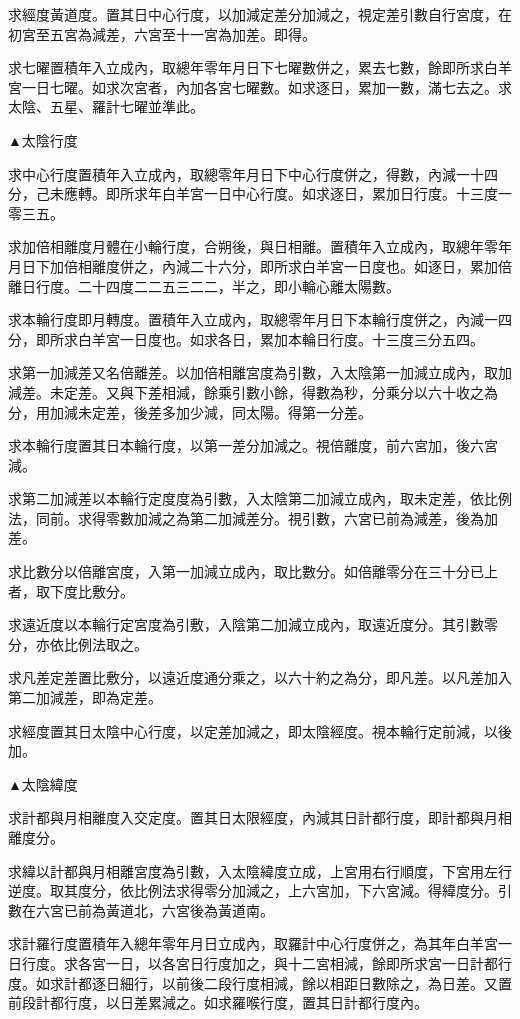 求經度黃道度。置其日中心行度，以加減定差分加減之，視定差引數自行宮度，在初宮至五宮為減差，六宮至十一宮為加差。即得。

求七曜置積年入立成內，取總年零年月日下七曜數併之，累去七數，餘即所求白羊宮一日七曜。如求次宮者，內加各宮七曜數。如求逐日，累加一數，滿七去之。求太陰、五星、羅計七曜並準此。

▲太陰行度

求中心行度置積年入立成內，取總零年月日下中心行度併之，得數，內減一十四分，己未應轉。即所求年白羊宮一日中心行度。如求逐日，累加日行度。十三度一零三五。

求加倍相離度月體在小輪行度，合朔後，與日相離。置積年入立成內，取總年零年月日下加倍相離度併之，內減二十六分，即所求白羊宮一日度也。如逐日，累加倍離日行度。二十四度二二五三二二，半之，即小輪心離太陽數。

求本輪行度即月轉度。置積年入立成內，取總零年月日下本輪行度併之，內減一四分，即所求白羊宮一日度也。如求各日，累加本輪日行度。十三度三分五四。

求第一加減差又名倍離差。以加倍相離宮度為引數，入太陰第一加減立成內，取加減差。未定差。又與下差相減，餘乘引數小餘，得數為秒，分乘分以六十收之為分，用加減未定差，後差多加少減，同太陽。得第一分差。

求本輪行度置其日本輪行度，以第一差分加減之。視倍離度，前六宮加，後六宮減。

求第二加減差以本輪行定度度為引數，入太陰第二加減立成內，取未定差，依比例法，同前。求得零數加減之為第二加減差分。視引數，六宮已前為減差，後為加差。

求比數分以倍離宮度，入第一加減立成內，取比數分。如倍離零分在三十分已上者，取下度比敷分。

求遠近度以本輪行定宮度為引敷，入陰第二加減立成內，取遠近度分。其引數零分，亦依比例法取之。

求凡差定差置比敷分，以遠近度通分乘之，以六十約之為分，即凡差。以凡差加入第二加減差，即為定差。

求經度置其日太陰中心行度，以定差加減之，即太陰經度。視本輪行定前減，以後加。

▲太陰緯度

求計都與月相離度入交定度。置其日太限經度，內減其日計都行度，即計都與月相離度分。

求緯以計都與月相離宮度為引數，入太陰緯度立成，上宮用右行順度，下宮用左行逆度。取其度分，依比例法求得零分加減之，上六宮加，下六宮減。得緯度分。引數在六宮已前為黃道北，六宮後為黃道南。

求計羅行度置積年入總年零年月日立成內，取羅計中心行度併之，為其年白羊宮一日行度。求各宮一日，以各宮日行度加之，與十二宮相減，餘即所求宮一日計都行度。如求計都逐日細行，以前後二段行度相減，餘以相距日數除之，為日差。又置前段計都行度，以日差累減之。如求羅喉行度，置其日計都行度內。

